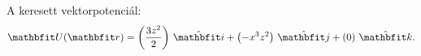 \documentclass[lang=magyar]{math-handout}
\begin{document}
\begin{exercise}
{\begin{enumerate}[a)]
\begin{itemize}
                    A keresett vektorpotenciál:
                    \[
                      \rvec U(\rvec r)
                      = \ijk{\frac{3z^2}{2}}{-x^3 z^2}{0}
                      \text.
                    \]
            \end{itemize}
    \end{enumerate}
  }
\end{exercise}
\end{document}
